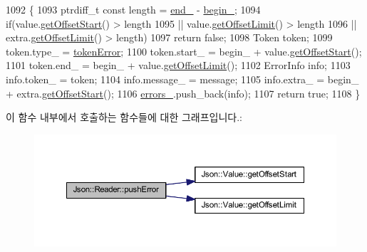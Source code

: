 \begin{DoxyCode}
1092                                                                                             \{
1093   ptrdiff\_t \textcolor{keyword}{const} length = \hyperlink{class_json_1_1_reader_a714793579cbf4ee7c5a7223d2c8d77c1}{end\_} - \hyperlink{class_json_1_1_reader_a327166839022ea91f0a8290960a8af76}{begin\_};
1094   \textcolor{keywordflow}{if}(value.\hyperlink{class_json_1_1_value_afa081dc764000951a1d8d6148155508e}{getOffsetStart}() > length
1095     || value.\hyperlink{class_json_1_1_value_a2cdfa01935f87fcace90d450cbd2c0a4}{getOffsetLimit}() > length
1096     || extra.\hyperlink{class_json_1_1_value_a2cdfa01935f87fcace90d450cbd2c0a4}{getOffsetLimit}() > length)
1097     \textcolor{keywordflow}{return} \textcolor{keyword}{false};
1098   Token token;
1099   token.type\_ = \hyperlink{class_json_1_1_reader_aa35e6ab574dc399a0a645ad98ed66bc9a55d1ab9135c3d068b57fafdbabfa569a}{tokenError};
1100   token.start\_ = begin\_ + value.\hyperlink{class_json_1_1_value_afa081dc764000951a1d8d6148155508e}{getOffsetStart}();
1101   token.end\_ = begin\_ + value.\hyperlink{class_json_1_1_value_a2cdfa01935f87fcace90d450cbd2c0a4}{getOffsetLimit}();
1102   ErrorInfo info;
1103   info.token\_ = token;
1104   info.message\_ = message;
1105   info.extra\_ = begin\_ + extra.\hyperlink{class_json_1_1_value_afa081dc764000951a1d8d6148155508e}{getOffsetStart}();
1106   \hyperlink{class_json_1_1_reader_a1bbce45dc4df753bed60c129f4b5147c}{errors\_}.push\_back(info);
1107   \textcolor{keywordflow}{return} \textcolor{keyword}{true};
1108 \}
\end{DoxyCode}
이 함수 내부에서 호출하는 함수들에 대한 그래프입니다.\+:\nopagebreak
\begin{figure}[H]
\begin{center}
\leavevmode
\includegraphics[width=350pt]{class_json_1_1_reader_a3568be9db568ff57bd3fcc373143dff3_cgraph}
\end{center}
\end{figure}
\mbox{\label{class_json_1_1_reader_afd9a30c0af205c9f327613f486fae6b8}} 

